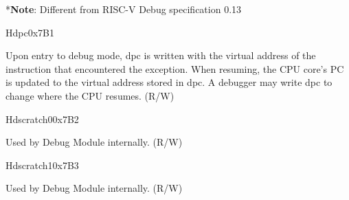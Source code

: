 *\textbf{Note}: Different from RISC-V Debug specification 0.13

\begin{register}{H}{dpc}{0x7B1}
\label{regdesc:DPC}
%
\regnewline%
\begin{regdesc}
\begin{reglist}
\label{fielddesc:DPC}\item [dpc] Upon entry to debug mode, dpc is written with the virtual address of the instruction that encountered the exception. When resuming, the CPU core's PC is updated to the virtual address stored in dpc. A debugger may write dpc to change where the CPU resumes. (R/W)
\end{reglist}
\end{regdesc}
\end{register}

\begin{register}{H}{dscratch0}{0x7B2}
\label{regdesc:DSCRATCH0}
%
\regnewline%
\begin{regdesc}
\begin{reglist}
\label{fielddesc:DSCRATCH0}\item [dscratch0] Used by Debug Module internally. (R/W)
\end{reglist}
\end{regdesc}
\end{register}

\begin{register}{H}{dscratch1}{0x7B3}
\label{regdesc:DSCRATCH1}
%
\regnewline%
\begin{regdesc}
\begin{reglist}
\label{fielddesc:DSCRATCH1}\item [dscratch1] Used by Debug Module internally. (R/W)
\end{reglist}
\end{regdesc}
\end{register}
